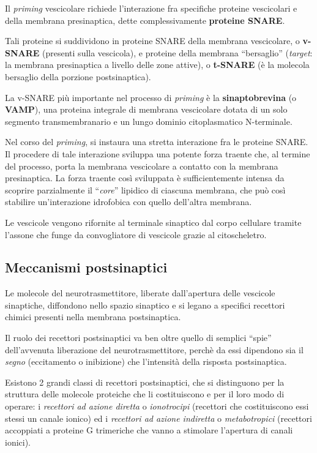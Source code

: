 \documentclass[]{article}
\begin{document}
Il \emph{priming} vescicolare richiede l'interazione fra specifiche
proteine vescicolari e della membrana presinaptica, dette
complessivamente \textbf{proteine SNARE}.

Tali proteine si suddividono in proteine SNARE della membrana
vescicolare, o \textbf{v-SNARE} (presenti sulla vescicola), e proteine
della membrana ``bersaglio'' (\emph{target}: la membrana presinaptica a
livello delle zone attive), o \textbf{t-SNARE} (è la molecola bersaglio
della porzione postsinaptica).

La v-SNARE più importante nel processo di \emph{priming} è la
\textbf{sinaptobrevina} (o \textbf{VAMP}), una proteina integrale di
membrana vescicolare dotata di un solo segmento transmembranario e un
lungo dominio citoplasmatico N-terminale.

Nel corso del \emph{priming}, si instaura una stretta interazione fra le
proteine SNARE. Il procedere di tale interazione sviluppa una potente
forza traente che, al termine del processo, porta la membrana
vescicolare a contatto con la membrana presinaptica. La forza traente
così sviluppata è sufficientemente intensa da scoprire parzialmente il
``\emph{core}'' lipidico di ciascuna membrana, che può così stabilire
un'interazione idrofobica con quello dell'altra membrana.

Le vescicole vengono rifornite al terminale sinaptico dal corpo
cellulare tramite l'assone che funge da convogliatore di vescicole
grazie al citoscheletro.

\subsection{Meccanismi postsinaptici}\label{meccanismi-postsinaptici}

Le molecole del neurotrasmettitore, liberate dall'apertura delle
vescicole sinaptiche, diffondono nello spazio sinaptico e si legano a
specifici recettori chimici presenti nella membrana postsinaptica.

Il ruolo dei recettori postsinaptici va ben oltre quello di semplici
``spie'' dell'avvenuta liberazione del neurotrasmettitore, perchè da
essi dipendono sia il \emph{segno} (eccitamento o inibizione) che
l'intensità della risposta postsinaptica.

Esistono 2 grandi classi di recettori postsinaptici, che si distinguono
per la struttura delle molecole proteiche che li costituiscono e per il
loro modo di operare: i \emph{recettori ad azione diretta} o
\emph{ionotrocipi} (recettori che costituiscono essi stessi un canale
ionico) ed i \emph{recettori ad azione indiretta} o \emph{metabotropici}
(recettori accoppiati a proteine G trimeriche che vanno a stimolare
l'apertura di canali ionici).
\end{document}
